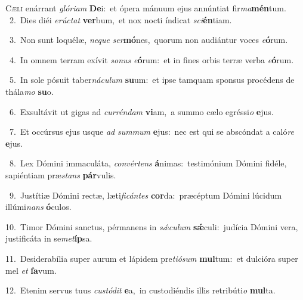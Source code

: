 \lettrine{\initial\textcolor{\initialcolor}{C}}{æli} enárrant \textit{gló}\-\textit{ri}\textit{am} \textbf{De}\-i:~\star et ópera mánuum ejus annúntiat fir\-\textit{ma}\-\textbf{mén}tum.\\
{\numbfont\textcolor{\numbcolor}{~2.}}~Dies diéi \textit{e}\-\textit{rúc}\textit{tat} \textbf{ver}\-bum,~\star et nox nocti índicat \textit{sci}\-\textbf{én}tiam.\par
{\numbfont\textcolor{\numbcolor}{~3.}}~Non sunt loquélæ, \textit{ne}\-\textit{que} \textit{ser}\-\textbf{mó}nes,~\star quorum non audiántur voces \textit{e}\-\textbf{ó}rum.\par
{\numbfont\textcolor{\numbcolor}{~4.}}~In omnem terram exívit \textit{so}\-\textit{nus} \textit{e}\-\textbf{ó}rum:~\star et in fines orbis terræ verba \textit{e}\-\textbf{ó}rum.\par
{\numbfont\textcolor{\numbcolor}{~5.}}~In sole pósuit taber\-\textit{ná}\-\textit{cu}\textit{lum} \textbf{su}\-um:~\star et ipse tamquam sponsus procédens de thála\textit{mo} \textbf{su}\-o.\par
{\numbfont\textcolor{\numbcolor}{~6.}}~Exsultávit ut gigas ad \textit{cur}\-\textit{rén}\textit{dam} \textbf{vi}\-am,~\star a summo cælo egréssi\textit{o} \textbf{e}\-jus.\par
{\numbfont\textcolor{\numbcolor}{~7.}}~Et occúrsus ejus usque \textit{ad} \textit{sum}\-\textit{mum} \textbf{e}\-jus:~\star nec est qui se abscóndat a caló\textit{re} \textbf{e}\-jus.\par
{\numbfont\textcolor{\numbcolor}{~8.}}~Lex Dómini immaculáta, \textit{con}\-\textit{vér}\textit{tens} \textbf{á}\-nimas:~\star testimónium Dómini fidéle, sapiéntiam præ\textit{stans} \textbf{pár}\-vulis.\par
{\numbfont\textcolor{\numbcolor}{~9.}}~Justítiæ Dómini rectæ, læti\-\textit{fi}\-\textit{cán}\textit{tes} \textbf{cor}\-da:~\star præcéptum Dómini lúcidum illúmi\textit{nans} \textbf{ó}\-culos.\par
{\numbfont\textcolor{\numbcolor}{10.}}~Timor Dómini sanctus, pérmanens in \textit{sǽ}\-\textit{cu}\textit{lum} \textbf{sǽ}\-culi:~\star judícia Dómini vera, justificáta in se\-\textit{met}\-\textbf{íp}sa.\par
{\numbfont\textcolor{\numbcolor}{11.}}~Desiderabília super aurum et lápidem pre\-\textit{ti}\-\textit{ó}\textit{sum} \textbf{mul}\-tum:~\star et dulcióra super mel \textit{et} \textbf{fa}\-vum.\par
{\numbfont\textcolor{\numbcolor}{12.}}~Etenim servus tuus \textit{cus}\-\textit{tó}\textit{dit} \textbf{e}\-a,~\star in custodiéndis illis retribúti\textit{o} \textbf{mul}\-ta.\par
